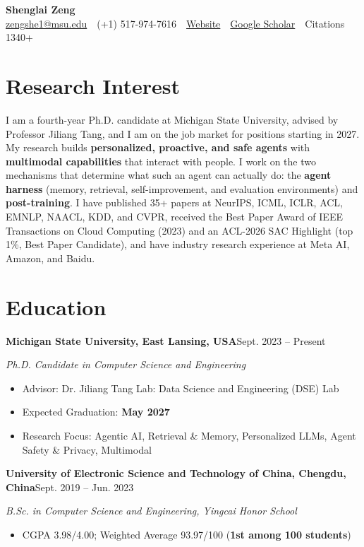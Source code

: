 \documentclass[12pt,letterpaper]{article}
\newcommand{\entry}[2]{\textbf{#1}\hfill #2\par}
\newcommand{\role}[1]{\textit{#1}\par}
\begin{document}
\begin{center}
  {\huge\bfseries Shenglai Zeng}\\[0.55em]
  \small
  \href{mailto:zengshe1@msu.edu}{zengshe1@msu.edu} \,\textbar\,
  (+1) 517-974-7616 \,\textbar\,
  \href{https://slz-ai.github.io/}{Website} \,\textbar\,
  \href{https://scholar.google.com/citations?user=2EFS5WEAAAAJ}{Google Scholar} \,\textbar\,
  Citations 1340+
\end{center}
\vspace{0.4em}

\section{Research Interest}
I am a fourth-year Ph.D. candidate at Michigan State University, advised by Professor Jiliang Tang,
and I am on the job market for positions starting in 2027. My research builds \textbf{personalized, proactive, and safe agents} with \textbf{multimodal capabilities} that interact with people. I work on the two mechanisms that determine what such an agent can actually do: the \textbf{agent harness} (memory, retrieval, self-improvement, and evaluation environments) and \textbf{post-training}. I have published 35+ papers at NeurIPS, ICML, ICLR, ACL, EMNLP, NAACL, KDD,
and CVPR, received the Best Paper Award of IEEE Transactions on Cloud Computing (2023) and an
ACL-2026 SAC Highlight (top 1\%, Best Paper Candidate), and have industry research experience at
Meta AI, Amazon, and Baidu.

\section{Education}
\entry{Michigan State University, East Lansing, USA}{Sept. 2023 -- Present}
\role{Ph.D. Candidate in Computer Science and Engineering}
\begin{itemize}
  \item Advisor: Dr. Jiliang Tang \quad\textbar\quad Lab: Data Science and Engineering (DSE) Lab
  \item Expected Graduation: \textbf{May 2027}
  \item Research Focus: Agentic AI, Retrieval \& Memory, Personalized LLMs, Agent Safety \& Privacy, Multimodal
\end{itemize}
\vspace{0.5em}
\entry{University of Electronic Science and Technology of China, Chengdu, China}{Sept. 2019 -- Jun. 2023}
\role{B.Sc. in Computer Science and Engineering, Yingcai Honor School}
\begin{itemize}
  \item CGPA 3.98/4.00; Weighted Average 93.97/100 (\textbf{1st among 100 students})
\end{itemize}
\end{document}
